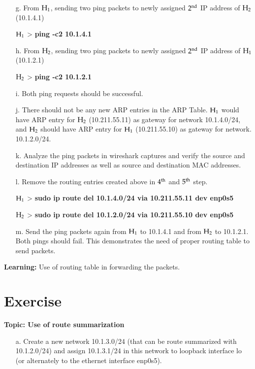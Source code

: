 \begin{multicols}{2}
\begin{itemize}
\item[g.] From ${\rm H}_{1}$, sending two ping packets to newly assigned $2^{\rm nd}$ IP address of ${\rm H}_{2}$ (10.1.4.1)

${\rm H}_{1}$ > \textbf{ping -c2 10.1.4.1}


\item[h.] From ${\rm H}_{2}$, sending two ping packets to newly assigned $2^{\rm nd}$ IP address of ${\rm H}_{1}$ (10.1.2.1)

${\rm H}_{2}$ > \textbf{ping -c2 10.1.2.1}

\item[i.] Both ping requests should be successful.

\item[j.] There should not be any new ARP entries in the ARP Table. ${\rm H}_{1}$ would have ARP entry for ${\rm H}_{2}$ (10.211.55.11) as gateway for network 10.1.4.0/24, and ${\rm H}_{2}$ should have ARP entry for ${\rm H}_{1}$ (10.211.55.10) as gateway for network. 10.1.2.0/24.


\item[k.] Analyze the ping packets in wireshark captures and verify the source and destination IP addresses as well as source and destination MAC addresses.

\item[l.] Remove the routing entries created above in $4^{\rm th}$ and $5^{\rm th}$ step.

${\rm H}_{1}$ > \textbf{sudo ip route del 10.1.4.0/24 via 10.211.55.11 dev enp0s5}

${\rm H}_{2}$ > \textbf{sudo ip route del 10.1.2.0/24 via 10.211.55.10 dev enp0s5}

\item[m.] Send the ping packets again from ${\rm H}_{1}$ to 10.1.4.1 and from ${\rm H}_{2}$ to 10.1.2.1. Both pings should fail. This demonstrates the need of proper routing table to send packets.

\end{itemize}

\textbf{Learning:} Use of routing table in forwarding the packets.

\section*{Exercise \label{chap2-exe3}}

\textbf{Topic: Use of route summarization}

\begin{itemize}
\item[a.] Create a new network 10.1.3.0/24 (that can be route summarized with 10.1.2.0/24) and assign 10.1.3.1/24 in this network to loopback interface lo (or alternately to the ethernet interface enp0s5).


\end{itemize}
\end{multicols}
